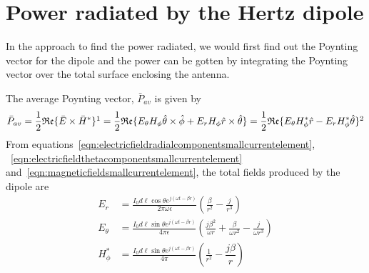 \chapter{Power radiated by the Hertz dipole}\label{lec:lec49}
In the approach to find the power radiated, we would first find out the Poynting vector for the dipole and the power can be gotten by integrating the Poynting vector 
over the total surface enclosing the antenna.

The average Poynting vector, $\bar{P}_{av}$ is given by
\begin{dmath*}
\bar{P}_{av} = \dfrac{1}{2}\mathfrak{Re}\{\bar{E} \times \bar{H}^\ast\}\footnotemark
= \frac{1}{2}\mathfrak{Re}\{E_\theta H_\phi\hat{\theta} \times \hat{\phi} + E_r H_\phi\hat{r}\times \hat{\theta}\}
= \frac{1}{2}\mathfrak{Re}\{E_\theta H_\phi^\ast\hat{r} - E_r H_\phi^\ast\hat{\theta}\}\footnotemark
\end{dmath*}
From equations~\eqref{eqn:electricfieldradialcomponentsmallcurrentelement}, ~\eqref{eqn:electricfieldthetacomponentsmallcurrentelement} and~\eqref{eqn:magneticfieldsmallcurrentelement}, the total fields produced by the dipole are
\begin{align*}
E_r &= \frac{I_0 d\ell\cos\theta e^{j(\omega t - \beta r)}}{2\pi\omega\epsilon}\left(\frac{\beta}{r^2} - \frac{j}{r^3}\right)\\  
E_\theta &= \frac{I_0 d\ell\sin\theta e^{j(\omega t - \beta r)}}{4\pi\epsilon}\left(\frac{j\beta^2}{\omega r} + \frac{\beta}{\omega r^2} - \frac{j}{\omega r^3}\right)\\    
H_\phi^\ast &= \frac{I_0 d\ell\sin\theta e^{j(\omega t - \beta r)}}{4\pi}\left(\frac{1}{r^2} - \dfrac{j\beta}{r}\right)
\end{align*}


